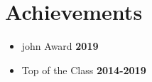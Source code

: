 \documentclass[letterpaper, 11pt]{article}
\newcommand{\secStartSpace}{\vspace{3pt}}
\begin{document}
\section{\color{red} \textbf{Achievements}}
\secStartSpace

\begin{addmargin}[1em]{1em}
	\begin{itemize}[itemsep=-2.25pt]
		\item john Award \hfill  \textbf{2019}
		\item Top of the Class \hfill \textbf{2014-2019}
	\end{itemize}
\end{addmargin}
\end{document}
